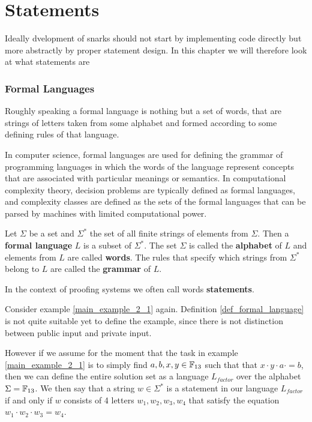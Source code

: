 \chapter{Statements}
Ideally dvelopment of snarks should not start by implementing code directly but more abstractly by proper statement design. In this chapter we will therefore look at what statements are
\subsection{Formal Languages}
Roughly speaking a formal language is nothing but a set of words, that are strings of letters taken from some alphabet and formed according to some defining rules of that language. 

In computer science, formal languages are used for defining the grammar of programming languages in which the words of the language represent concepts that are associated with particular meanings or semantics. In computational complexity theory, decision problems are typically defined as formal languages, and complexity classes are defined as the sets of the formal languages that can be parsed by machines with limited computational power. 

\begin{definition}
\label{def_formal_language}
 Let $\Sigma$ be a set and $\Sigma^*$ the set of all finite strings of elements from $\Sigma$. Then a \textbf{formal language} $L$ is a subset of $\Sigma^*$. The set $\Sigma$ is called the \textbf{alphabet} of $L$ and elements from $L$ are called \textbf{words}. The rules that specify which strings from $\Sigma^*$ belong to $L$ are called the \textbf{grammar} of $L$. 

In the context of proofing systems we often call words \textbf{statements}.
\end{definition}

\begin{example}
\label{main_example_2_2}
Consider example \ref{main_example_2_1} again. Definition \ref{def_formal_language} is not quite suitable yet to define the example, since there is not distinction between public input and private input.

However if we assume for the moment that the task in example \ref{main_example_2_1} is to simply find $a,b,x,y\in \mathbb{F}_{13}$ such that that $x\cdot y\cdot a\cdot =b$, then we can define the entire solution set as a language $L_{factor}$ over the alphabet $\Sigma = \mathbb{F}_{13}$. We then say that a string $w\in \Sigma^*$ is a statement in our language $L_{factor}$ if and only if $w$ consists of 4 letters $w_1,w_2,w_3,w_4$ that satisfy the equation $w_1\cdot w_2\cdot w_3 =w_4$.
\end{example}

